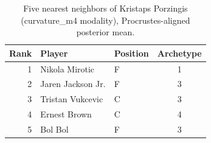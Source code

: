 \begin{table}[htbp]
  \centering\small
  \begin{tabular}{rllc}
    \toprule
    Rank & Player & Position & Archetype \\
    \midrule
    1 & Nikola Mirotic & F & 1 \\
    2 & Jaren Jackson Jr. & F & 3 \\
    3 & Tristan Vukcevic & C & 3 \\
    4 & Ernest Brown & C & 4 \\
    5 & Bol Bol & F & 3 \\
    \bottomrule
  \end{tabular}
  \caption{Five nearest neighbors of Kristaps Porzingis (curvature_m4 modality), Procrustes-aligned posterior mean.}
  \label{tab:Kristaps_Porzingis_neighbors_curvature_m4}
\end{table}

